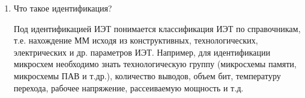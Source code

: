 \documentclass[a4paper,14pt]{article}
\begin{document}
\begin{enumerate}
\item Что такое идентификация?

Под идентификацией ИЭТ понимается классификация ИЭТ по справочникам, т.е. нахождение ММ исходя из конструктивных, технологических, электрических и др. параметров ИЭТ. 
Например, для идентификации микросхем необходимо знать технологическую группу (микросхемы памяти, микросхемы ПАВ и т.др.), количество выводов, объем бит, температуру перехода, рабочее напряжение, рассеиваемую мощность и т.д.
\end{enumerate}
\end{document}
